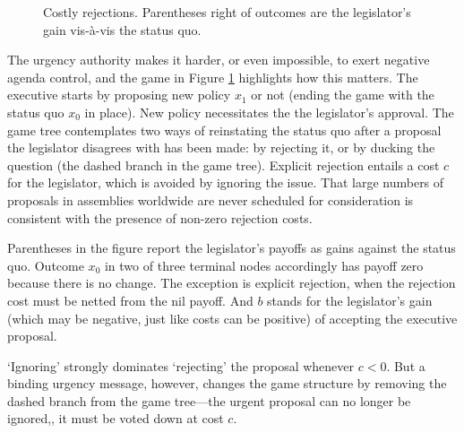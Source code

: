 \documentclass[letter,12pt]{article}
\begin{document}
\begin{figure}
  \caption{Costly rejections. Parentheses right of outcomes are the legislator's gain vis-\`a-vis the status quo.}\label{f:costly}
\end{figure}


The urgency authority makes it harder, or even impossible, to exert negative agenda control, and the game in Figure \ref{f:costly} highlights how this matters. The executive starts by proposing new policy $x_1$ or not (ending the game with the status quo $x_0$ in place). New policy necessitates the the legislator's approval. The game tree contemplates two ways of reinstating the status quo after a proposal the legislator disagrees with has been made: by rejecting it, or by ducking the question (the dashed branch in the game tree). Explicit rejection entails a cost $c$ for the legislator, which is avoided by ignoring the issue. That large numbers of proposals in assemblies worldwide are never scheduled for consideration is consistent with the presence of non-zero rejection costs. 

Parentheses in the figure report the legislator's payoffs as gains against the status quo. Outcome $x_0$ in two of three terminal nodes accordingly has payoff zero because there is no change. The exception is explicit rejection, when the rejection cost must be netted from the nil payoff. And $b$ stands for the legislator's gain (which may be negative, just like costs can be positive) of accepting the executive proposal. 

`Ignoring' strongly dominates `rejecting' the proposal whenever $c<0$. But a binding urgency message, however, changes the game structure by removing the dashed branch from the game tree---the urgent proposal can no longer be ignored,, it must be voted down at cost $c$. 
\end{document}
